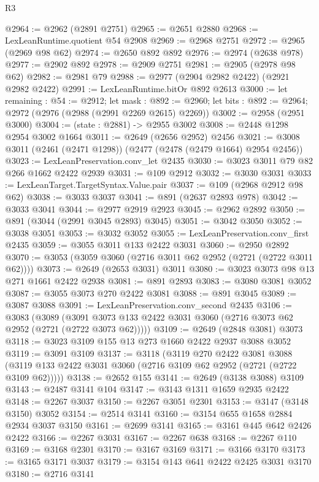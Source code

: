 \begin{lexlean}{R3}
\begin{coremodule}
@2964 := @2962 (@2891 @2751)
@2965 := @2651 @2880
@2968 := LexLeanRuntime.quotient @54 @2908
@2969 := @2968 @2751
@2972 := @2965 (@2969 @98 @62)
@2974 := @2650 @892 @892
@2976 := @2974 (@2638 @978)
@2977 := @2902 @892
@2978 := @2909 @2751
@2981 := @2905 (@2978 @98 @62)
@2982 := @2981 @79
@2988 := @2977 (@2904 @2982 @2422) (@2921 @2982 @2422)
@2991 := LexLeanRuntime.bitOr @892 @2613
@3000 := let remaining : @54 := @2912;
  let mask : @892 := @2960;
  let bits : @892 := @2964; @2972 (@2976 (@2988 (@2991 @2269 @2615) @2269))
@3002 := @2958 (@2951 @3000)
@3004 := (state : @2881) -> @2955 @3002
@3008 := @2448 @1298 @2954 @3002 @1664
@3011 := @2649 (@2656 @2952) @2456
@3021 := @3008 @3011 (@2461 (@2471 @1298)) (@2477 (@2478 (@2479 @1664) @2954 @2456))
@3023 := LexLeanPreservation.conv_let @2435
@3030 := @3023 @3011 @79 @82 @266 @1662 @2422 @2939
@3031 := @109 @2912
@3032 := @3030 @3031
@3033 := LexLeanTarget.TargetSyntax.Value.pair
@3037 := @109 (@2968 @2912 @98 @62)
@3038 := @3033 @3037
@3041 := @891 (@2637 @2893 @978)
@3042 := @3033 @3041
@3044 := @2977 @2919 @2923
@3045 := @2962 @2892
@3050 := @891 (@3044 (@2991 @3045 @2893) @3045)
@3051 := @3042 @3050
@3052 := @3038 @3051
@3053 := @3032 @3052
@3055 := LexLeanPreservation.conv_first @2435
@3059 := @3055 @3011 @133 @2422 @3031
@3060 := @2950 @2892
@3070 := @3053 (@3059 @3060 (@2716 @3011 @62 @2952 (@2721 (@2722 @3011 @62))))
@3073 := @2649 (@2653 @3031) @3011
@3080 := @3023 @3073 @98 @13 @271 @1661 @2422 @2938
@3081 := @891 @2893
@3083 := @3080 @3081 @3052
@3087 := @3055 @3073 @270 @2422 @3081
@3088 := @891 @3045
@3089 := @3087 @3088
@3091 := LexLeanPreservation.conv_second @2435
@3106 := @3083
    (@3089 (@3091 @3073 @133 @2422 @3031 @3060 (@2716 @3073 @62 @2952 (@2721 (@2722 @3073 @62)))))
@3109 := @2649 (@2848 @3081) @3073
@3118 := @3023 @3109 @155 @13 @273 @1660 @2422 @2937 @3088 @3052
@3119 := @3091 @3109
@3137 := @3118
    (@3119
      @270
      @2422
      @3081
      @3088
      (@3119 @133 @2422 @3031 @3060 (@2716 @3109 @62 @2952 (@2721 (@2722 @3109 @62)))))
@3138 := @2652 @155
@3141 := @2649 (@3138 @3088) @3109
@3143 := @2487 @3141 @104
@3147 := @3143 @1311 @1659 @2935 @2422
@3148 := @2267 @3037
@3150 := @2267 @3051 @2301
@3153 := @3147 (@3148 @3150) @3052
@3154 := @2514 @3141
@3160 := @3154 @655 @1658 @2884 @2934 @3037 @3150
@3161 := @2699 @3141
@3165 := @3161 @445 @642 @2426 @2422
@3166 := @2267 @3031
@3167 := @2267 @638
@3168 := @2267 @110
@3169 := @3168 @2301
@3170 := @3167 @3169
@3171 := @3166 @3170
@3173 := @3165 @3171 @3037
@3179 := @3154 @143 @641 @2422 @2425 @3031 @3170
@3180 := @2716 @3141

\end{coremodule}
\end{lexlean}

